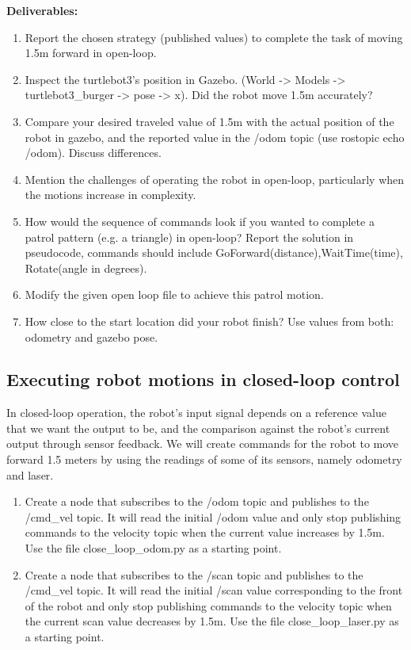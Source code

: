 \documentclass[12pt]{article}
\begin{document}
\textbf{Deliverables:}
\begin{enumerate}
    \item Report the chosen strategy (published values) to complete the task of moving 1.5m forward in open-loop.
    
    \item Inspect the turtlebot3’s position in Gazebo. (World -> Models -> turtlebot3\_burger -> pose -> x). Did the robot move 1.5m accurately?
    
    \item Compare your desired traveled value of 1.5m with the actual position of the robot in gazebo, and the reported value in the /odom topic (use rostopic echo /odom). Discuss differences.
  
    \item Mention the challenges of operating the robot in open-loop, particularly when the motions increase in complexity.
    \item How would the sequence of commands look if you wanted to complete a patrol pattern (e.g. a triangle) in open-loop? Report the solution in pseudocode, commands should include GoForward(distance),WaitTime(time), Rotate(angle in degrees).
    \item Modify the given open loop file to achieve this patrol motion.
    \item How close to the start location did your robot finish? Use values from both: odometry and gazebo pose.
\end{enumerate}

\subsection{Executing robot motions in closed-loop control}
In closed-loop operation, the robot’s input signal depends on a reference value that we want the output to be, and the comparison against the robot’s current output through sensor feedback. We will create commands for the robot to move forward 1.5 meters by using the readings of some of its sensors, namely odometry and laser.

\begin{enumerate}
    \item Create a node that subscribes to the /odom topic and publishes to the /cmd\_vel topic. It will read the initial /odom value and only stop publishing commands to the velocity topic when the current value increases by 1.5m. Use the file close\_loop\_odom.py as a starting point.
    
    \item Create a node that subscribes to the /scan topic and publishes to the /cmd\_vel topic. It will read the initial /scan value corresponding to the front of the robot and only stop publishing commands to the velocity topic when the current scan value decreases by 1.5m. Use the file close\_loop\_laser.py as a starting point.

\end{enumerate}
\end{document}
